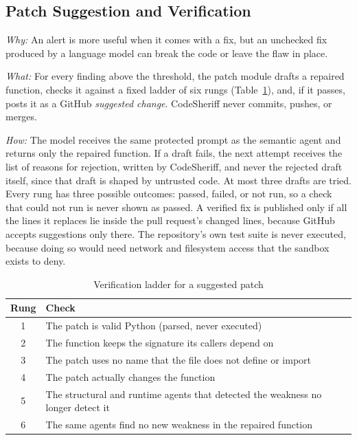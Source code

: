 \documentclass[conference]{IEEEtran}
\begin{document}
\subsection{Patch Suggestion and Verification}
\label{subsec:patch}

\textit{Why:} An alert is more useful when it comes with a fix, but an
unchecked fix produced by a language model can break the code or leave the
flaw in place.

\textit{What:} For every finding above the threshold, the patch module
drafts a repaired function, checks it against a fixed ladder of six rungs
(Table~\ref{tab:ladder}), and, if it passes, posts it as a GitHub
\emph{suggested change}. CodeSheriff never commits, pushes, or merges.

\textit{How:} The model receives the same protected prompt as the semantic
agent and returns only the repaired function. If a draft fails, the next
attempt receives the list of reasons for rejection, written by CodeSheriff,
and never the rejected draft itself, since that draft is shaped by
untrusted code. At most three drafts are tried. Every rung has three
possible outcomes: passed, failed, or not run, so a check that could not
run is never shown as passed. A verified fix is published only if all the
lines it replaces lie inside the pull request's changed lines, because
GitHub accepts suggestions only there. The repository's own test suite is
never executed, because doing so would need network and filesystem access
that the sandbox exists to deny.

\begin{table}[t]
\centering
\caption{Verification ladder for a suggested patch}
\label{tab:ladder}
\small
\setlength{\tabcolsep}{3pt}
\begin{tabular}{cp{6.9cm}}
\toprule
Rung & Check \\
\midrule
1 & The patch is valid Python (parsed, never executed) \\
2 & The function keeps the signature its callers depend on \\
3 & The patch uses no name that the file does not define or import \\
4 & The patch actually changes the function \\
5 & The structural and runtime agents that detected the weakness no longer detect it \\
6 & The same agents find no new weakness in the repaired function \\
\bottomrule
\end{tabular}
\end{table}
\end{document}
